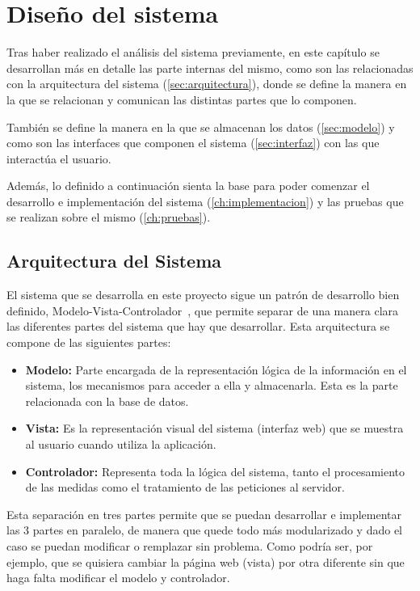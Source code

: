 \chapter{Diseño del sistema}
\label{ch:diseno}
Tras haber realizado el análisis del sistema previamente, en este capítulo se desarrollan más en detalle las parte internas del mismo, como son las relacionadas con la arquitectura del sistema (\autoref{sec:arquitectura}), donde se define la manera en la que se relacionan y comunican las distintas partes que lo componen.

También se define la manera en la que se almacenan los datos (\autoref{sec:modelo}) y como son las interfaces que componen el sistema (\autoref{sec:interfaz}) con las que interactúa el usuario. 

Además, lo definido a continuación sienta la base para poder comenzar el desarrollo e implementación del sistema (\autoref{ch:implementacion}) y las pruebas que se realizan sobre el mismo (\autoref{ch:pruebas}).

\section{Arquitectura del Sistema}\label{sec:arquitectura}
El sistema que se desarrolla en este proyecto sigue un patrón de desarrollo bien definido, Modelo-Vista-Controlador~\cite{bucanek_model-view-controller_2009,hernandez_mvc_nodate}, que permite separar de una manera clara las diferentes partes del sistema que hay que desarrollar. Esta arquitectura se compone de las siguientes partes:
\begin{itemize}
	\item \textbf{Modelo:} Parte encargada de la representación lógica de la información en el sistema, los mecanismos para acceder a ella y almacenarla. Esta es la parte relacionada con la base de datos.
	\item \textbf{Vista:} Es la representación visual del sistema (interfaz web) que se muestra al usuario cuando utiliza la aplicación.
	\item \textbf{Controlador:} Representa toda la lógica del sistema, tanto el procesamiento de las medidas como el tratamiento de las peticiones al servidor.
\end{itemize}

Esta separación en tres partes permite que se puedan desarrollar e implementar las 3 partes en paralelo, de manera que quede todo más modularizado y dado el caso se puedan modificar o remplazar sin problema. Como podría ser, por ejemplo, que se quisiera cambiar la página web (vista) por otra diferente sin que haga falta modificar el modelo y controlador. 

